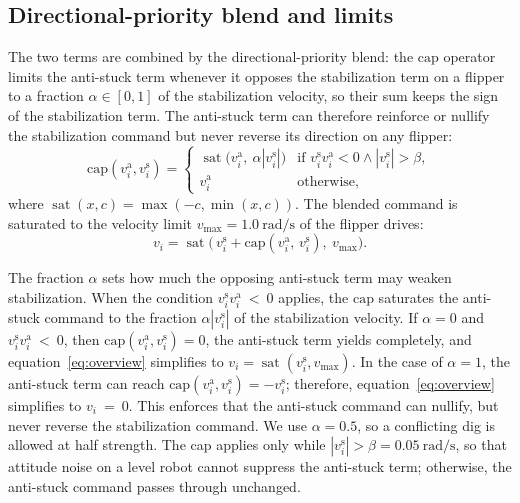 \subsection{Directional-priority blend and limits}\label{sec:method-blend}
The two terms are combined by the directional-priority blend: the $\mathrm{cap}$ operator
limits the anti-stuck term whenever it opposes the stabilization term on a flipper to a
fraction $\alpha\in[0,1]$ of the stabilization velocity, so their sum keeps the sign of the stabilization
term. The anti-stuck term can therefore reinforce or nullify the stabilization command but
never reverse its direction on any flipper:
\begin{equation}
  \mathrm{cap}(v^{\mathrm{a}}_i,v^{\mathrm{s}}_i)=
  \begin{cases}
        \operatorname{sat}\big(v^{\mathrm{a}}_i,\ \alpha |v^{\mathrm{s}}_i|\big)
      & \text{if } v^{\mathrm{s}}_i v^{\mathrm{a}}_i<0 \wedge |v^{\mathrm{s}}_i|>\beta,\\[2pt]
    v^{\mathrm{a}}_i & \text{otherwise,}
  \end{cases}
      \label{eq:cap}
\end{equation}
where $\operatorname{sat}(x,c)=\max(-c,\min(x,c))$. 
The blended command is saturated to
the velocity limit $v_{\max}=\SI{1.0}{\radian\per\second}$ of the flipper drives:
\begin{equation}
  v_i = \operatorname{sat}\big(\, v^{\mathrm{s}}_i + \mathrm{cap}(v^{\mathrm{a}}_i,\,v^{\mathrm{s}}_i),\ v_{\max}\big).
  \label{eq:overview}
\end{equation}

The fraction $\alpha$ sets how much the opposing anti-stuck term may weaken stabilization. When the condition $v^{\mathrm{s}}_i v^{\mathrm{a}}_i~<~0$ applies, the $\mathrm{cap}$ saturates the anti-stuck command to the fraction $\alpha |v^{\mathrm{s}}_i|$ of the stabilization velocity. If $\alpha=0$ and $v^{\mathrm{s}}_i v^{\mathrm{a}}_i~<~0$, then $\mathrm{cap}(v^{\mathrm{a}}_i,v^{\mathrm{s}}_i)=0$, the anti-stuck term yields completely, and equation~\eqref{eq:overview} simplifies to $v_i=\operatorname{sat}(v^{\mathrm{s}}_i, v_{\max})$. In the case of $\alpha=1$, the anti-stuck term can
reach $\mathrm{cap}(v^{\mathrm{a}}_i,v^{\mathrm{s}}_i)=-v^{\mathrm{s}}_i$; therefore, equation~\eqref{eq:overview} simplifies to $v_i~=~0$. This enforces that the anti-stuck command can nullify, but never reverse the stabilization command. We use $\alpha=0.5$, so a conflicting dig is allowed at half strength. The cap
applies only while $|v^{\mathrm{s}}_i|>\beta=\SI{0.05}{\radian\per\second}$, so that
attitude noise on a level robot cannot suppress the anti-stuck term; otherwise, the
anti-stuck command passes through unchanged.

